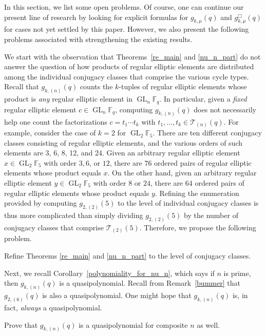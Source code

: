 \documentclass[Unicode,ALCO]{cedram}
\DeclareMathOperator{\GL}{GL}
\newcommand{\F}{\mathbb{F}}
\newcommand{\CT}{\mathcal{T}}
\begin{document}
In this section, we list some open problems.
Of course, one can continue our present line of research by looking for explicit formulas for \(g_{k,\mu} (q)\) and \(g_{k,\mu}^\Box (q)\) for cases not yet settled by this paper.
However, we also present the following problems associated with strengthening the existing results.

We start with the observation that Theorems~\ref{re_main} and \ref{nu_n_part} do not answer the question of how products of regular elliptic elements are distributed among the individual conjugacy classes that comprise the various cycle types.
Recall that \(g_{k,(n)} (q)\) counts the \(k\)-tuples of regular elliptic elements whose product is \emph{any} regular elliptic element in \(\GL_n \F_q\).
In particular, given a \emph{fixed} regular elliptic element \(c \in \GL_n \F_q\), computing \(g_{k,(n)} (q)\) does not necessarily help one count the factorizations \(c = t_1 \cdots t_k\) with \(t_1,\ldots,t_k \in \CT_{(n)} (q)\).
For example, consider the case of \(k=2\) for \(\GL_2 \F_5\).
There are ten different conjugacy classes consisting of regular elliptic elements, and the various orders of such elements are 3, 6, 8, 12, and 24.
Given an arbitrary regular elliptic element \(x \in \GL_2 \F_5\) with order \(3, 6\), or \(12\), there are \(76\) ordered pairs of regular elliptic elements whose product equals \(x\).
On the other hand,
given an arbitrary regular elliptic element \(y \in \GL_2 \F_5\) with order \(8\) or \(24\), there are \(64\) ordered pairs of regular elliptic elements whose product equals \(y\).
Refining the enumeration provided by computing \(g_{2,(2)} (5)\) to the level of individual conjugacy classes is thus more complicated than simply dividing \(g_{2,(2)} (5)\) by the number of conjugacy classes that comprise \(\CT_{(2)} (5)\).
Therefore, we propose the following problem.

\begin{problem}
Refine Theorems \ref{re_main} and \ref{nu_n_part} to the level of conjugacy classes.
\end{problem}


Next, we recall Corollary~\ref{polynomiality_for_nu_n}, which says if \(n\) is prime, then \(g_{k,(n)} (q)\) is a quasipolynomial.
Recall from Remark~\ref{bummer} that \(g_{2,(6)} (q)\) is also a quasipolynomial.
One might hope that \(g_{k,(n)}(q)\) is, in fact, \emph{always} a quasipolynomial.

\begin{problem}
\label{prob:quasipoly}
Prove that \(g_{k,(n)} (q)\) is a quasipolynomial for composite \(n\) as well.
\end{problem}
\end{document}
